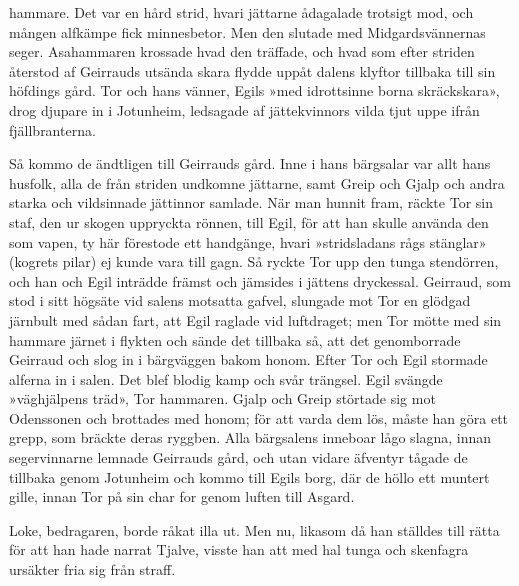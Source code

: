 hammare. Det var en hård strid, hvari jättarne
ådagalade\protect\hypertarget{lb1625905.xhtmlux5cux23start55}{}{}\protect\hypertarget{lb1625905.xhtmlux5cux23start55-a}{}{}\protect\hypertarget{lb1625905.xhtmlux5cux23start55-b}{}{}\protect\hypertarget{lb1625905.xhtmlux5cux23start55-c}{}{}\protect\hypertarget{lb1625905.xhtmlux5cux23start55-d}{}{}
trotsigt mod, och mången alfkämpe fick minnesbetor. Men den slutade med
Midgardsvännernas seger. Asahammaren krossade hvad den träffade, och
hvad som efter striden återstod af Geirrauds utsända skara flydde uppåt
dalens klyftor tillbaka till sin höfdings gård. Tor och hans vänner,
Egils »med idrottsinne borna skräckskara», drog djupare in i Jotunheim,
ledsagade af jättekvinnors vilda tjut uppe ifrån fjällbranterna.

Så kommo de ändtligen till Geirrauds gård. Inne i hans bärgsalar var
allt hans husfolk, alla de från striden undkomne jättarne, samt Greip
och Gjalp och andra starka och vildsinnade jättinnor samlade. När man
hunnit fram, räckte Tor sin staf, den ur skogen uppryckta rönnen, till
Egil, för att han skulle använda den som vapen, ty här förestode ett
handgänge, hvari »stridsladans rågs stänglar» (kogrets pilar) ej kunde
vara till gagn. Så ryckte Tor upp den tunga stendörren, och han och Egil
inträdde främst och jämsides i jättens dryckessal. Geirraud, som stod i
sitt högsäte vid salens motsatta gafvel, slungade mot Tor en glödgad
järnbult med sådan fart, att Egil raglade vid luftdraget; men Tor mötte
med sin hammare järnet i flykten och sände det tillbaka så, att det
genomborrade Geirraud och slog in i bärgväggen bakom honom. Efter Tor
och Egil stormade alferna in i salen. Det blef blodig kamp och svår
trängsel. Egil svängde »väghjälpens träd», Tor hammaren. Gjalp och Greip
störtade sig mot Odenssonen och brottades med honom; för att varda dem
lös, måste han göra ett grepp, som bräckte deras ryggben. Alla
bärgsalens inneboar lågo slagna, innan segervinnarne lemnade Geirrauds
gård, och utan vidare äfventyr tågade de tillbaka genom Jotunheim och
kommo till Egils borg, där de höllo ett muntert gille, innan Tor på sin
char for genom luften till Asgard.

Loke, bedragaren, borde råkat illa ut. Men nu, likasom då han ställdes
till rätta för att han hade narrat Tjalve, visste han att med hal tunga
och skenfagra ursäkter fria sig från straff.

\protect\hypertarget{lb1625905.xhtmlux5cux23start56}{}{}\protect\hypertarget{lb1625905.xhtmlux5cux23start56-a}{}{}\protect\hypertarget{lb1625905.xhtmlux5cux23start56-b}{}{}\protect\hypertarget{lb1625905.xhtmlux5cux23start56-c}{}{}\protect\hypertarget{lb1625905.xhtmlux5cux23start56-d}{}{}

